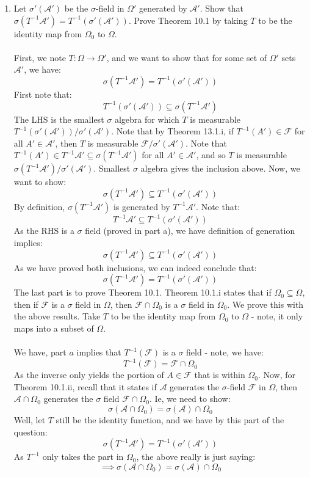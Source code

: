 \documentclass[12pt,a4paper]{article}
\newcommand{\1}[1]{\mathbbm{1}\left\{ #1 \right\}}
\newcommand{\acal}{\mathcal{A}}
\newcommand{\fcal}{\mathcal{F}}
\begin{document}
\begin{enumerate}
	\item Let $\sigma'(\acal')$ be the $\sigma$-field in $\Omega'$ generated by $\acal'$. Show that $\sigma(T^{-1}\acal') = T^{-1}(\sigma'(\acal'))$. Prove Theorem 10.1 by taking $T$ to be the identity map from $\Omega_0$ to $\Omega$.
	\\\\
	First, we note $T: \Omega \to \Omega'$, and we want to show that for some set of $\Omega'$ sets $\acal'$, we have:
	$$
		\sigma(T^{-1}\acal') = T^{-1}(\sigma'(\acal'))
	$$
	First note that:
	$$
		T^{-1}(\sigma'(\acal')) \subseteq \sigma(T^{-1}\acal')
	$$
	The LHS is the smallest $\sigma$ algebra for which $T$ is measurable $T^{-1}(\sigma'(\acal'))/\sigma'(\acal')$. Note that by Theorem 13.1.i, if $T^{-1}(A') \in \fcal$ for all $A' \in \acal'$, then $T$ is measurable $\fcal/\sigma'(\acal')$. Note that $T^{-1}(A') \in T^{-1}\acal' \subseteq \sigma(T^{-1}\acal')$ for all $A' \in \acal'$, and so $T$ is measurable $\sigma(T^{-1}\acal')/\sigma'(\acal')$. Smallest $\sigma$ algebra gives the inclusion above. Now, we want to show:
	$$
		\sigma(T^{-1}\acal') \subseteq T^{-1}(\sigma'(\acal'))
	$$
	By definition, $\sigma(T^{-1}\acal')$ is generated by $T^{-1}\acal'$. Note that:
	$$
		T^{-1}\acal' \subseteq T^{-1}(\sigma'(\acal'))
	$$
	As the RHS is a $\sigma$ field (proved in part a), we have definition of generation implies:
	$$
		\sigma(T^{-1}\acal') \subseteq T^{-1}(\sigma'(\acal'))
	$$
	As we have proved both inclusions, we can indeed conclude that:
	$$
		\sigma(T^{-1}\acal') = T^{-1}(\sigma'(\acal'))
	$$
	The last part is to prove Theorem 10.1. Theorem 10.1.i states that if $\Omega_0 \subseteq \Omega$, then if $\fcal$ is a $\sigma$ field in $\Omega$, then $\fcal \cap \Omega_0$ is a $\sigma$ field in $\Omega_0$. We prove this with the above results. Take $T$ to be the identity map from $\Omega_0$ to $\Omega$ - note, it only maps into a subset of $\Omega$.
	\\\\
	We have, part $a$ implies that $T^{-1}(\fcal)$ is a $\sigma$ field - note, we have:
	$$
		T^{-1}(\fcal) = \fcal \cap \Omega_0
	$$
	As the inverse only yields the portion of $A \in \fcal$ that is within $\Omega_0$. Now, for Theorem 10.1.ii, recall that it states if $\acal$ generates the $\sigma$-field $\fcal$ in $\Omega$, then $\acal \cap \Omega_0$ generates the $\sigma$ field $\fcal \cap \Omega_0$. Ie, we need to show:
	$$
		\sigma(\acal \cap \Omega_0) = \sigma(\acal) \cap \Omega_0
	$$
	Well, let $T$ still be the identity function, and we have by this part of the question:
	$$
		\sigma(T^{-1}\acal') = T^{-1}(\sigma'(\acal'))
	$$
	As $T^{-1}$ only takes the part in $\Omega_0$, the above really is just saying:
	$$
		\implies \sigma(\acal \cap \Omega_0) = \sigma(\acal) \cap \Omega_0
	$$
	
\end{enumerate}
\end{document}
